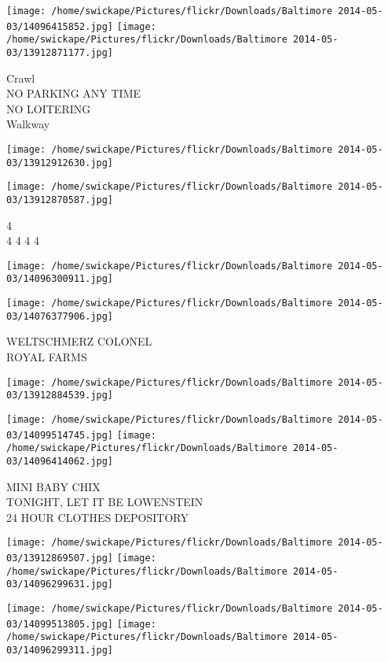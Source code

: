 \documentclass[10pt,letterpaper]{article}
\begin{document}
\texttt{[image: /home/swickape/Pictures/flickr/Downloads/Baltimore 2014-05-03/14096415852.jpg]}
\texttt{[image: /home/swickape/Pictures/flickr/Downloads/Baltimore 2014-05-03/13912871177.jpg]}

Crawl\\
NO PARKING ANY TIME\\
NO LOITERING\\
Walkway
\pagebreak

\texttt{[image: /home/swickape/Pictures/flickr/Downloads/Baltimore 2014-05-03/13912912630.jpg]}

\vspace{0.25in}
\texttt{[image: /home/swickape/Pictures/flickr/Downloads/Baltimore 2014-05-03/13912870587.jpg]}

4\\
4 4 4 4
\pagebreak

\texttt{[image: /home/swickape/Pictures/flickr/Downloads/Baltimore 2014-05-03/14096300911.jpg]}

\vspace{0.25in}
\texttt{[image: /home/swickape/Pictures/flickr/Downloads/Baltimore 2014-05-03/14076377906.jpg]}

WELTSCHMERZ COLONEL\\
ROYAL FARMS
\pagebreak

\texttt{[image: /home/swickape/Pictures/flickr/Downloads/Baltimore 2014-05-03/13912884539.jpg]}

\vspace{0.25in}
\texttt{[image: /home/swickape/Pictures/flickr/Downloads/Baltimore 2014-05-03/14099514745.jpg]}
\texttt{[image: /home/swickape/Pictures/flickr/Downloads/Baltimore 2014-05-03/14096414062.jpg]}

MINI BABY CHIX\\
TONIGHT, LET IT BE LOWENSTEIN\\
24 HOUR CLOTHES DEPOSITORY
\pagebreak

\texttt{[image: /home/swickape/Pictures/flickr/Downloads/Baltimore 2014-05-03/13912869507.jpg]}
\texttt{[image: /home/swickape/Pictures/flickr/Downloads/Baltimore 2014-05-03/14096299631.jpg]}

\texttt{[image: /home/swickape/Pictures/flickr/Downloads/Baltimore 2014-05-03/14099513805.jpg]}
\texttt{[image: /home/swickape/Pictures/flickr/Downloads/Baltimore 2014-05-03/14096299311.jpg]}
\end{document}
